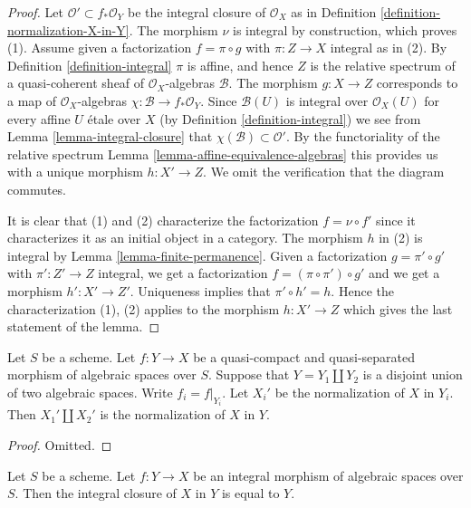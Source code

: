\begin{proof}
Let $\mathcal{O}' \subset f_*\mathcal{O}_Y$ be the integral closure of
$\mathcal{O}_X$ as in Definition \ref{definition-normalization-X-in-Y}.
The morphism $\nu$ is integral by construction, which proves (1).
Assume given a factorization $f = \pi \circ g$ with $\pi : Z \to X$
integral as in (2). By Definition \ref{definition-integral}
$\pi$ is affine, and hence $Z$ is the relative
spectrum of a quasi-coherent sheaf of $\mathcal{O}_X$-algebras $\mathcal{B}$.
The morphism $g : X \to Z$ corresponds to a map of $\mathcal{O}_X$-algebras
$\chi : \mathcal{B} \to f_*\mathcal{O}_Y$. Since $\mathcal{B}(U)$ is
integral over $\mathcal{O}_X(U)$ for every affine $U$ \'etale over $X$
(by Definition \ref{definition-integral})
we see from Lemma \ref{lemma-integral-closure}
that $\chi(\mathcal{B}) \subset \mathcal{O}'$.
By the functoriality of the relative spectrum
Lemma \ref{lemma-affine-equivalence-algebras}
this provides us with a unique morphism
$h : X' \to Z$. We omit the verification that the diagram commutes.

\medskip\noindent
It is clear that (1) and (2) characterize the
factorization $f = \nu \circ f'$ since it characterizes it
as an initial object in a category. The morphism $h$ in (2)
is integral by Lemma \ref{lemma-finite-permanence}.
Given a factorization $g = \pi' \circ g'$ with $\pi' : Z' \to Z$
integral, we get a factorization $f = (\pi \circ \pi') \circ g'$ and
we get a morphism $h' : X' \to Z'$. Uniqueness implies that
$\pi' \circ h' = h$. Hence the characterization (1), (2) applies
to the morphism $h : X' \to Z$ which gives the last statement of the lemma.
\end{proof}

\begin{lemma}
\label{lemma-normalization-in-disjoint-union}
Let $S$ be a scheme.
Let $f : Y \to X$ be a quasi-compact and quasi-separated morphism of
algebraic spaces over $S$.
Suppose that $Y = Y_1 \coprod Y_2$ is a disjoint union of two
algebraic spaces.
Write $f_i = f|_{Y_i}$. Let $X_i'$ be the normalization of $X$ in $Y_i$.
Then $X_1' \coprod X_2'$ is the normalization of $X$ in $Y$.
\end{lemma}

\begin{proof}
Omitted.
\end{proof}

\begin{lemma}
\label{lemma-normalization-in-integral}
Let $S$ be a scheme. Let $f : Y \to X$ be an integral morphism
of algebraic spaces over $S$.
Then the integral closure of $X$ in $Y$ is equal to $Y$.
\end{lemma}

